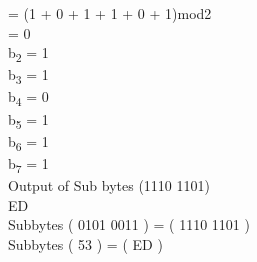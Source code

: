 \documentclass[11pt]{article}
\begin{document}
	\hspace{0.55cm}= (1 + 0 + 1 + 1 + 0 + 1)mod2\\
	\hspace{0.55cm}= 0\\
	b\textsubscript{2} = 1\\
	b\textsubscript{3} = 1\\
	b\textsubscript{4} = 0\\
	b\textsubscript{5} = 1\\
	b\textsubscript{6} = 1\\
	b\textsubscript{7} = 1\\
	Output of Sub bytes (1110 1101)\\
	\hspace{4cm} E\hspace{0.5cm}D\\
	Subbytes ( 0101 0011 ) = ( 1110 1101 )\\
	Subbytes ( 53 ) = ( ED )\vspace{0.2cm}\\
\end{document}
